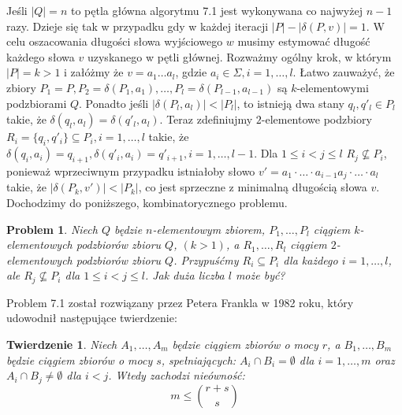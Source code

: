 \documentclass[12pt,a4paper]{article}
\newtheorem{twr}{Twierdzenie}[section]
\newtheorem{pro}{Problem}[section]
\begin{document}
 
Je\'sli $|Q|=n$ to p\k{e}tla g{\l}\'owna algorytmu 7.1 jest wykonywana co najwy\.zej $n-1$ razy. Dzieje si\k{e} tak w  przypadku gdy w każdej iteracji $|P|-|\delta(P,v)|=1$. W celu oszacowania d{\l}ugo\'sci s{\l}owa wyj\'sciowego $w$ musimy estymowa\'c d{\l}ugo\'s\'c ka\.zdego s{\l}owa $v$ uzyskanego w  p\k{e}tli g{\l}\'ownej. 
Rozwa\.zmy og\'olny krok, w kt\'orym $|P|=k>1$ i za{\l}\'o\.zmy \.ze $v=a_{1}\ldots a_{l}$, gdzie $a_{i}\in \Sigma, i=1,\ldots, l$. {\L}atwo zauwa\.zy\'c, \.ze zbiory $P_{1}=P, P_{2}=\delta(P_{1},a_{1}),\ldots, P_{l}=\delta(P_{l-1},a_{l-1})$ s\k{a} $k$-elementowymi podzbiorami $Q$. Ponadto je\'sli $|\delta(P_{l},a_{l})|<|P_{l}|$, to istniej\k{a} dwa stany $q_{l},q'_{l}\in P_{l}$ takie, \.ze $\delta(q_{l},a_{l})=\delta(q'_{l},a_{l})$. Teraz zdefiniujmy  $2$-elementowe podzbiory $R_{i}=\{q_{i},q'_{i}\}\subseteq P_{i}, i=1,\ldots,l$ takie, \.ze $\delta(q_{i},a_{i})=q_{i+1}, \delta(q'_{i},a_{i})=q'_{i+1}, i=1,\ldots,l-1$. Dla $1\leq i<j\leq l$ $R_{j}\not\subseteq P_{i}$, poniewa\.z wprzeciwnym przypadku istnia{\l}oby s{\l}owo $v'=a_{1}\cdot\ldots\cdot a_{i-1}a_{j}\cdot\ldots\cdot a_{l}$ takie, \.ze $|\delta(P_{k},v')|<|P_{k}|$, co jest sprzeczne z  minimaln\k{a} d{\l}ugo\'sci\k{a} s{\l}owa $v$. Dochodzimy do poni\.zszego, kombinatorycznego problemu.

\begin{pro}
Niech $Q$ b\k{e}dzie $n$-elementowym zbiorem, $P_{1},\ldots,P_{l}$ ci\k{a}giem $k$-elementowych podzbior\'ow zbioru $Q$, $(k>1)$, a $R_{1},\ldots,R_{l}$ ci\k{a}giem $2$-elementowych podzbior\'ow zbioru $Q$. Przypu\'s\'cmy $R_{i}\subseteq P_{i}$ dla ka\.zdego $i=1,\ldots,l$, ale $R_{j}\not\subseteq P_{i}$ dla $1\leq i<j\leq l$. Jak du\.za liczba $l$ mo\.ze by\'c?
\end{pro}

Problem 7.1 zosta{\l} rozwi\k{a}zany przez Petera Frankla w 1982 roku, kt\'ory udowodni{\l} nast\k{e}puj\k{a}ce twierdzenie: 

\begin{twr} 
Niech $A_{1},\ldots,A_{m}$ b\k{e}dzie ci\k{a}giem zbior\'ow o mocy $r$, a $B_{1},\ldots,B_{m}$ b\k{e}dzie ci\k{a}giem zbior\'ow o mocy $s$, spe{\l}niaj\k{a}cych: $A_{i}\cap B_{i}=\emptyset$ dla $i=1,\ldots,m$ oraz $A_{i}\cap B_{j}\neq\emptyset$ dla $i<j$. Wtedy zachodzi nie\'owno\'s\'c:
\begin{equation} 
m\leq{{r+s}\choose{s}}
\end{equation}
\end{twr} 
\end{document}

